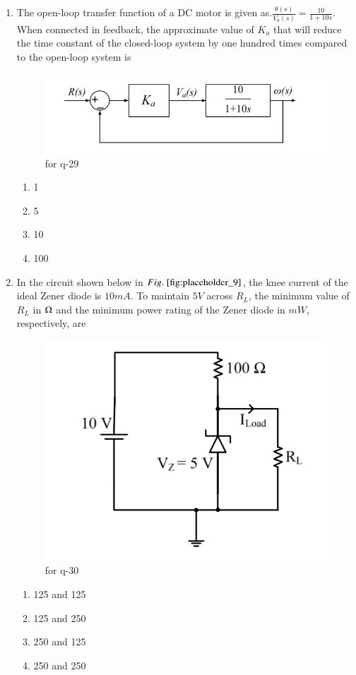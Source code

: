 \documentclass[journal,12pt,onecolumn]{IEEEtran}
\theoremstyle{remark}
\begin{document}
\begin{enumerate}
\item The open-loop transfer function of a DC motor is given as.$\frac{\theta(s)}{V_a(s)} = \frac{10}{1 + 10s}$. When connected in feedback, the approximate value of $K_a$ that will reduce the time constant of the closed-loop system by one hundred times compared to the open-loop system is
\begin{figure}[H]
    \centering
    \includegraphics[width=0.5\columnwidth]{figs/fig_8.png}
    \caption{for q-29}
    \label{fig:placeholder_8}
\end{figure}
\begin{multicols}{4}
\begin{enumerate}
\item 1
\item 5
\item 10
\item 100
\end{enumerate}
\end{multicols}
\hfill {}

\item In the circuit shown below in $\figref{fig:placeholder_9}$, the knee current of the ideal Zener diode is $10 mA$. To maintain $5 V$ across $R_L$, the minimum value of $R_L$ in $\ohm$ and the minimum power rating of the Zener diode in $mW$, respectively, are
\begin{figure}[H]
    \centering
    \includegraphics[width=0.5\columnwidth]{figs/fig_9.png}
    \caption{for q-30}
    \label{fig:placeholder_9}
\end{figure}
\begin{enumerate}
\item 125 and 125
\item 125 and 250
\item 250 and 125
\item 250 and 250
\end{enumerate}
\hfill {}


\end{enumerate}
\end{document}
